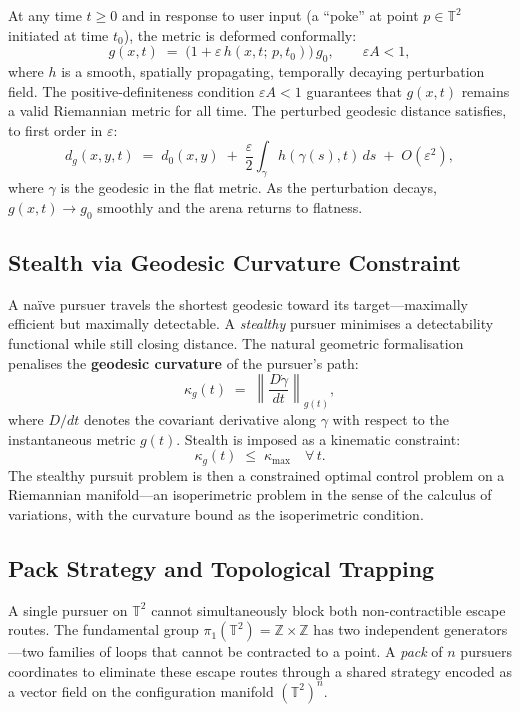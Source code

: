 At any time $t \geq 0$ and in response to user input (a ``poke'' at point
$p \in \mathbb{T}^2$ initiated at time $t_0$), the metric is deformed
conformally:
\[
  g(x, t) \;=\; \bigl(1 + \varepsilon\, h(x, t;\, p, t_0)\bigr)\, g_0,
  \qquad \varepsilon A < 1,
\]
where $h$ is a smooth, spatially propagating, temporally decaying perturbation
field. The positive-definiteness condition $\varepsilon A < 1$ guarantees that
$g(x,t)$ remains a valid Riemannian metric for all time. The perturbed geodesic
distance satisfies, to first order in $\varepsilon$:
\[
  d_g(x, y, t) \;=\; d_0(x,y)
    \;+\; \frac{\varepsilon}{2}\int_\gamma h(\gamma(s), t)\,ds
    \;+\; O(\varepsilon^2),
\]
where $\gamma$ is the geodesic in the flat metric. As the perturbation decays,
$g(x,t) \to g_0$ smoothly and the arena returns to flatness.

\subsection*{Stealth via Geodesic Curvature Constraint}

A na\"ive pursuer travels the shortest geodesic toward its target---maximally
efficient but maximally detectable. A \emph{stealthy} pursuer minimises a
detectability functional while still closing distance. The natural geometric
formalisation penalises the \textbf{geodesic curvature} of the pursuer's path:
\[
  \kappa_g(t) \;=\; \left\| \frac{D\dot{\gamma}}{dt} \right\|_{g(t)},
\]
where $D/dt$ denotes the covariant derivative along $\gamma$ with respect to
the instantaneous metric $g(t)$. Stealth is imposed as a kinematic constraint:
\[
  \kappa_g(t) \;\leq\; \kappa_{\max} \quad \forall\, t.
\]
The stealthy pursuit problem is then a constrained optimal control problem on
a Riemannian manifold---an isoperimetric problem in the sense of the calculus
of variations, with the curvature bound as the isoperimetric condition.

\subsection*{Pack Strategy and Topological Trapping}

A single pursuer on $\mathbb{T}^2$ cannot simultaneously block both
non-contractible escape routes. The fundamental group
$\pi_1(\mathbb{T}^2) = \mathbb{Z} \times \mathbb{Z}$ has two independent
generators---two families of loops that cannot be contracted to a point.
A \emph{pack} of $n$ pursuers coordinates to eliminate these escape routes
through a shared strategy encoded as a vector field on the configuration
manifold $(\mathbb{T}^2)^n$.

